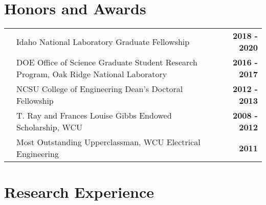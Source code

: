\documentclass{article}
\begin{document}
\section*{Honors and Awards}

	\begin{tabularx}{\textwidth}{l X r}
		\hspace{2em} & Idaho National Laboratory Graduate Fellowship & \textbf{2018 - 2020} \\
					 & DOE Office of Science Graduate Student Research Program, Oak Ridge National Laboratory & \textbf{2016 - 2017} \\
					 & NCSU College of Engineering Dean's Doctoral Fellowship & \textbf{2012 - 2013} \\
					 & T. Ray and Frances Louise Gibbs Endowed Scholarship, WCU & \textbf{2008 - 2012} \\
					 & Most Outstanding Upperclassman, WCU Electrical Engineering & \textbf{2011}				 
	\end{tabularx}

\section*{Research Experience}
\end{document}
